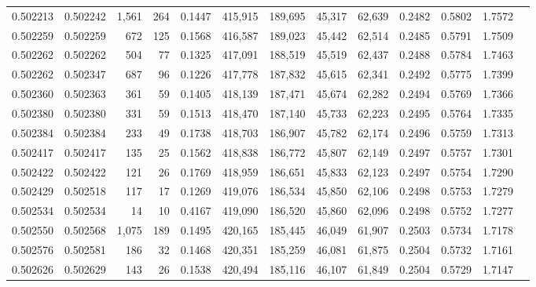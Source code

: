 \begin{tabular}{rrrrrrrrrrrrr}
0.502213 & 0.502242 & 1,561 &   264 &                                     0.1447 & 415,915 & 189,695 &  45,317 &  62,639 & 0.2482 & 0.5802 & 1.7572 \\
0.502259 & 0.502259 &   672 &   125 &                                     0.1568 & 416,587 & 189,023 &  45,442 &  62,514 & 0.2485 & 0.5791 & 1.7509 \\
0.502262 & 0.502262 &   504 &    77 &                                     0.1325 & 417,091 & 188,519 &  45,519 &  62,437 & 0.2488 & 0.5784 & 1.7463 \\
0.502262 & 0.502347 &   687 &    96 &                                     0.1226 & 417,778 & 187,832 &  45,615 &  62,341 & 0.2492 & 0.5775 & 1.7399 \\
0.502360 & 0.502363 &   361 &    59 &                                     0.1405 & 418,139 & 187,471 &  45,674 &  62,282 & 0.2494 & 0.5769 & 1.7366 \\
0.502380 & 0.502380 &   331 &    59 &                                     0.1513 & 418,470 & 187,140 &  45,733 &  62,223 & 0.2495 & 0.5764 & 1.7335 \\
0.502384 & 0.502384 &   233 &    49 &                                     0.1738 & 418,703 & 186,907 &  45,782 &  62,174 & 0.2496 & 0.5759 & 1.7313 \\
0.502417 & 0.502417 &   135 &    25 &                                     0.1562 & 418,838 & 186,772 &  45,807 &  62,149 & 0.2497 & 0.5757 & 1.7301 \\
0.502422 & 0.502422 &   121 &    26 &                                     0.1769 & 418,959 & 186,651 &  45,833 &  62,123 & 0.2497 & 0.5754 & 1.7290 \\
0.502429 & 0.502518 &   117 &    17 &                                     0.1269 & 419,076 & 186,534 &  45,850 &  62,106 & 0.2498 & 0.5753 & 1.7279 \\
0.502534 & 0.502534 &    14 &    10 &                                     0.4167 & 419,090 & 186,520 &  45,860 &  62,096 & 0.2498 & 0.5752 & 1.7277 \\
0.502550 & 0.502568 & 1,075 &   189 &                                     0.1495 & 420,165 & 185,445 &  46,049 &  61,907 & 0.2503 & 0.5734 & 1.7178 \\
0.502576 & 0.502581 &   186 &    32 &                                     0.1468 & 420,351 & 185,259 &  46,081 &  61,875 & 0.2504 & 0.5732 & 1.7161 \\
0.502626 & 0.502629 &   143 &    26 &                                     0.1538 & 420,494 & 185,116 &  46,107 &  61,849 & 0.2504 & 0.5729 & 1.7147 \\

\end{tabular}
